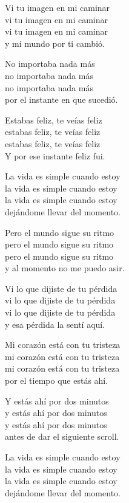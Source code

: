 \begin{lyrics}
Vi tu imagen en mi caminar\\
vi tu imagen en mi caminar\\
vi tu imagen en mi caminar\\
y mi mundo por ti cambió.

No importaba nada más\\
no importaba nada más\\
no importaba nada más\\
por el instante en que sucedió.

Estabas feliz, te veías feliz\\
estabas feliz, te veías feliz\\
estabas feliz, te veías feliz\\
Y por ese instante feliz fui.

La vida es simple cuando estoy\\
la vida es simple cuando estoy\\
la vida es simple cuando estoy\\
dejándome llevar del momento.

Pero el mundo sigue su ritmo\\
pero el mundo sigue su ritmo\\
pero el mundo sigue su ritmo\\
y al momento no me puedo asir.

Vi lo que dijiste de tu pérdida\\
vi lo que dijiste de tu pérdida\\
vi lo que dijiste de tu pérdida\\
y esa pérdida la sentí aquí.

Mi corazón está con tu tristeza\\
mi corazón está con tu tristeza\\
mi corazón está con tu tristeza\\
por el tiempo que estás ahí.

Y estás ahí por dos minutos\\
y estás ahí por dos minutos\\
y estás ahí por dos minutos\\
antes de dar el siguiente scroll.

La vida es simple cuando estoy\\
la vida es simple cuando estoy\\
la vida es simple cuando estoy\\
dejándome llevar del momento.


\end{lyrics}

